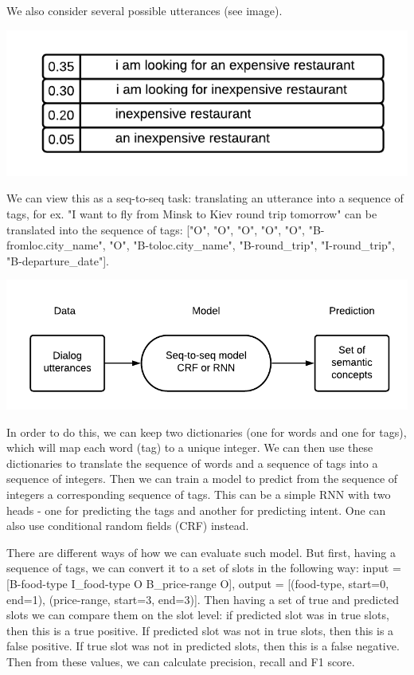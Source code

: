 \documentclass[12pt,titlepage,a4paper]{article}
\begin{document}
We also consider several possible utterances (see image).
\begin{center}
    \includegraphics{uncertanty.png}
\end{center}

We can view this as a seq-to-seq task: translating an utterance into a sequence of tags, for ex. "I want to fly from Minsk to Kiev round trip tomorrow" can be translated into the sequence of tags: ["O", "O", "O", "O", "O", "B-fromloc.city\_name", "O", "B-toloc.city\_name", "B-round\_trip", "I-round\_trip", "B-departure\_date"].
\begin{center}
    \includegraphics[width=\linewidth]{training-2-2.png}
\end{center}

In order to do this, we can keep two dictionaries (one for words and one for tags), which will map each word (tag) to a unique integer. We can then use these dictionaries to translate the sequence of words and a sequence of tags into a sequence of integers. Then we can train a model to predict from the sequence of integers a corresponding sequence of tags. This can be a simple RNN with two heads - one for predicting the tags and another for predicting intent. One can also use conditional random fields (CRF) instead.

There are different ways of how we can evaluate such model. But first, having a sequence of tags, we can convert it to a set of slots in the following way: input = [B-food-type I\_food-type O B\_price-range O], output = [(food-type, start=0, end=1), (price-range, start=3, end=3)]. Then having a set of true and predicted slots we can compare them on the slot level: if predicted slot was in true slots, then this is a true positive. If predicted slot was not in true slots, then this is a false positive. If true slot was not in predicted slots, then this is a false negative. Then from these values, we can calculate precision, recall and F1 score.
\end{document}
